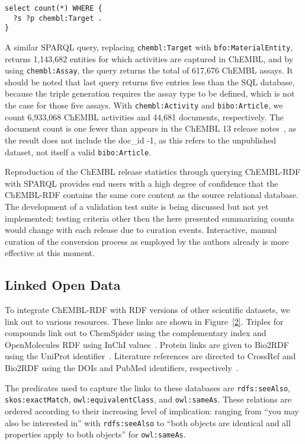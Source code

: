 \documentclass[10pt]{bmc_article}
\newenvironment{bmcformat}{\begin{raggedright}\baselineskip20pt\sloppy\setboolean{publ}{false}}{\end{raggedright}\baselineskip20pt\sloppy}
\begin{document}
\begin{bmcformat}
\begin{small}
\begin{verbatim}
select count(*) WHERE {
  ?s ?p chembl:Target .
}
\end{verbatim}
\end{small}

A similar SPARQL query, replacing \verb+chembl:Target+ with \verb+bfo:MaterialEntity+, returns 1,143,682 entities for which activities are captured in ChEMBL, and by using \verb+chembl:Assay+, the query returns the total of 617,676 ChEMBL assays.
It should be noted that last query returns five entries less than the SQL database, because the
triple generation requires the assay type to be defined, which is not the case for those 
five assays. With \verb+chembl:Activity+ and \verb+bibo:Article+, we count 6,933,068 ChEMBL activities and 44,681 documents,
respectively. The document count is one fewer than appears 
in the ChEMBL 13 release notes~\cite{ChEMBL13ReleaseNotes}, as the result does not include the doc\_id -1, as this refers to the 
unpublished dataset, not itself a valid \verb+bibo:Article+.

Reproduction of the ChEMBL release statistics through querying ChEMBL-RDF with SPARQL 
provides end users with a high degree of confidence that the ChEMBL-RDF contains the same 
core content as the source relational database. The development of a validation test suite
is being discussed but not yet implemented; testing criteria other then the here presented
summarizing counts would change with each release due to curation events. Interactive,
manual curation of the conversion process as employed by the authors already is more effective
at this moment.

\subsection*{Linked Open Data}

To integrate ChEMBL-RDF with RDF versions of other scientific datasets, we link out to various resources.
These links are shown in Figure~\ref{2}. Triples for compounds link out to ChemSpider 
using the complementary index and OpenMolecules RDF using InChI values~\cite{Pence2010,Bradley2009,Willighagen2011}.
Protein links are given to Bio2RDF~\cite{Belleau2008}
using the UniProt identifier~\cite{TheUniProtConsortium2010}. Literature references are directed to CrossRef and Bio2RDF 
using the DOIs and PubMed identifiers, respectively~\cite{Bilder2011}.

The predicates used to capture the links to these databases are
\verb+rdfs:seeAlso+, \verb+skos:exactMatch+, \verb+owl:equivalentClass+, and \verb+owl:sameAs+. 
These relations are ordered according to their increasing level of implication:
ranging from ``you may also be interested in'' with \verb+rdfs:seeAlso+ to
``both objects are identical  and all properties apply to both objects'' for
\verb+owl:sameAs+.


\end{bmcformat}
\end{document}
